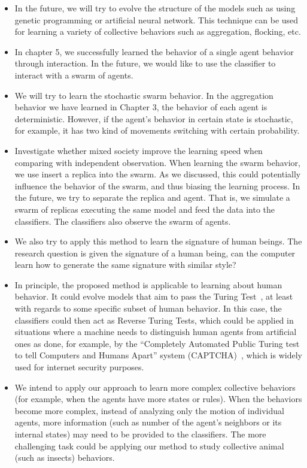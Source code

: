 \begin{itemize}

\item In the future, we will try to evolve the structure of the models such as using genetic programming or artificial neural network. This technique can be used for learning a variety of collective behaviors such as aggregation, flocking, etc.

\item In chapter 5, we successfully learned the behavior of a single agent behavior through interaction. In the future, we would like to use the classifier to interact with a swarm of agents. 

\item We will try to learn the stochastic swarm behavior. In the aggregation behavior we have learned in Chapter 3, the behavior of each agent is deterministic. However, if the agent's behavior in certain state is stochastic, for example, it has two kind of movements switching with certain probability.  

\item Investigate whether mixed society improve the learning speed when comparing with independent observation. When learning the swarm behavior, we use insert a replica into the swarm. As we discussed, this could potentially influence the behavior of the swarm, and thus biasing the learning process. In the future, we try to separate the replica and agent. That is, we simulate a swarm of replicas executing the same model and feed the data into the classifiers. The classifiers also observe the swarm of agents. 

\item We also try to apply this method to learn the signature of human beings. The research question is given the signature of  a human being, can the computer learn how to generate the same signature with similar style? 

\item In principle, the proposed method is applicable to learning about human behavior. It could evolve models that aim to pass the Turing Test~\citep{Turing1950}, at least with regards to some specific subset of human behavior. In this case, the classifiers could then act as Reverse Turing Tests, which could be applied in situations where a machine needs to distinguish human agents from artificial ones as done, for example, by the ``Completely Automated Public Turing test to tell Computers and Humans Apart'' system (CAPTCHA)~\citep{captcha2008}, which is widely used for internet security purposes.

\item We intend to apply our approach to learn more complex collective behaviors (for example, when the agents have more states or rules). When the behaviors become more complex, instead of analyzing only the motion of individual agents, more information (such as number of the agent's neighbors or its internal states) may need to be provided to the classifiers. The more challenging task could be applying our method to study collective animal (such as insects) behaviors. 

\end{itemize}

